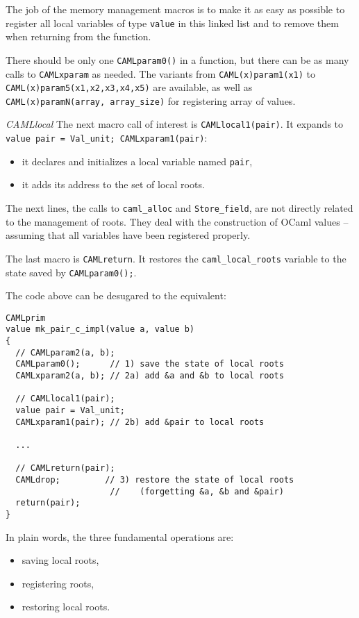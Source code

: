 \documentclass[a4paper]{easychair}
\begin{document}
The job of the memory management macros is to make it as easy as
possible to register all local variables of type \texttt{value} in this
linked list and to remove them when returning from the function.

There should be only one \texttt{CAMLparam0()} in a function, but there
can be as many calls to \texttt{CAMLxparam} as needed. The variants from
\texttt{CAML(x)param1(x1)} to \texttt{CAML(x)param5(x1,x2,x3,x4,x5)} are
available, as well as \texttt{CAML(x)paramN(array,\ array\_size)} for
registering array of values.

\emph{CAMLlocal} The next macro call of interest is
\texttt{CAMLlocal1(pair)}. It expands to
\texttt{value\ pair\ =\ Val\_unit;\ CAMLxparam1(pair)}:

\begin{itemize}
\item it declares and initializes a local variable named \texttt{pair},
\item it adds its address to the set of local roots.
\end{itemize}

The next lines, the calls to \texttt{caml\_alloc} and
\texttt{Store\_field}, are not directly related to the management of
roots. They deal with the construction of OCaml values -- assuming that
all variables have been registered properly.

The last macro is \texttt{CAMLreturn}. It restores the
\texttt{caml\_local\_roots} variable to the state saved by
\texttt{CAMLparam0();}.

The code above can be desugared to the equivalent:

\begin{lstlisting}[]
CAMLprim
value mk_pair_c_impl(value a, value b)
{
  // CAMLparam2(a, b);
  CAMLparam0();      // 1) save the state of local roots
  CAMLxparam2(a, b); // 2a) add &a and &b to local roots

  // CAMLlocal1(pair);
  value pair = Val_unit;
  CAMLxparam1(pair); // 2b) add &pair to local roots

  ...
  
  // CAMLreturn(pair);
  CAMLdrop;         // 3) restore the state of local roots
                     //    (forgetting &a, &b and &pair)
  return(pair);
}
\end{lstlisting}

In plain words, the three fundamental operations are:

\begin{itemize}
\item saving local roots,
\item registering roots,
\item restoring local roots.
\end{itemize}
\end{document}
